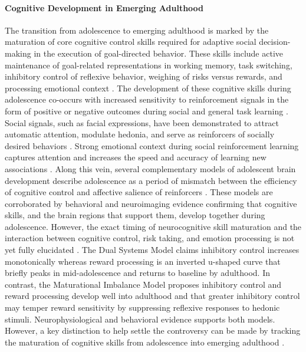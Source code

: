 \documentclass{article}%
\begin{document}
\paragraph*{Cognitive Development in Emerging Adulthood}
The transition from adolescence to emerging adulthood is marked by the maturation of core cognitive control skills required for adaptive social decision-making in the execution of goal-directed behavior. These skills include active maintenance of goal-related representations in working memory, task switching, inhibitory control of reflexive behavior, weighing of risks versus rewards, and processing emotional context \citep{luna2015}. 
The development of these cognitive skills during adolescence co-occurs with increased sensitivity to reinforcement signals in the form of positive or negative outcomes during social and general task learning \citep{jones2014adolescent, rosenbaum2020valence}. Social signals, such as facial expressions, have been demonstrated to attract automatic attention, modulate hedonia, and serve as reinforcers of socially desired behaviors \citep{teufel2009social,speer2007face}. Strong emotional context during social reinforcement learning captures attention and increases the speed and accuracy of learning new associations \citep{vernetti2017gaze,roper2014value}. Along this vein, several complementary models of adolescent brain development describe adolescence as a period of mismatch between the efficiency of cognitive control and affective salience of   reinforcers \citep{CaseyEtAl2008, LunaWright2016}. These models are corroborated by behavioral and neuroimaging evidence confirming that cognitive skills, and the brain regions that support them, develop together during adolescence.  However, the exact timing of neurocognitive skill maturation and the interaction between cognitive control, risk taking, and emotion processing is not yet fully elucidated \citep{shulman2016dual, duell2016interaction}. The Dual Systems Model claims inhibitory control increases monotonically whereas reward processing is an inverted u-shaped curve that briefly peaks in mid-adolescence and returns to baseline by adulthood. In contrast, the Maturational Imbalance Model proposes inhibitory control and reward processing develop well into adulthood and that greater inhibitory control may temper reward sensitivity by suppressing reflexive responses to hedonic stimuli. Neurophysiological and behavioral evidence supports both models. However, a key distinction to help settle the controversy can be made by tracking the maturation of cognitive skills from adolescence into emerging adulthood \citep{Steinberg2010,somerville2016searching}.
%
\end{document}
